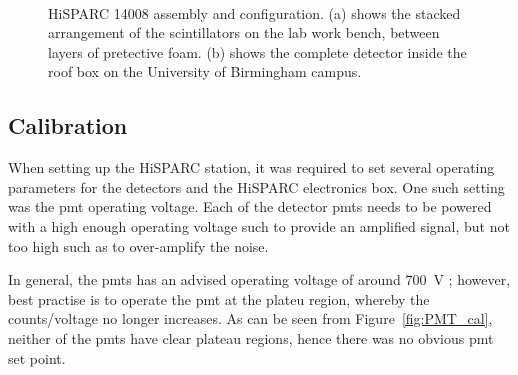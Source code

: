 \begin{figure}[ht]
	\centering
	 \\
	
	\caption{HiSPARC 14008 assembly and configuration. (a) shows the stacked arrangement of the scintillators on the lab work bench, between layers of pretective foam. (b) shows the complete detector inside the roof box on the University of Birmingham campus.}
	\label{fig:HS_14008_setup}
\end{figure}


\subsection{Calibration}

When setting up the HiSPARC station, it was required to set several operating parameters for the detectors and the HiSPARC electronics box. One such setting was the \gls{pmt} operating voltage. Each of the detector \glspl{pmt} needs to be powered with a high enough operating voltage such to provide an amplified signal, but not too high such as to over-amplify the noise.

In general, the \glspl{pmt} has an advised operating voltage of around 700~V \citep{fokkema_hisparc_2019}; however, best practise is to operate the \gls{pmt} at the plateu region, whereby the counts/voltage no longer increases. As can be seen from Figure~\ref{fig:PMT_cal}, neither of the \glspl{pmt} have clear plateau regions, hence there was no obvious \gls{pmt} set point.

